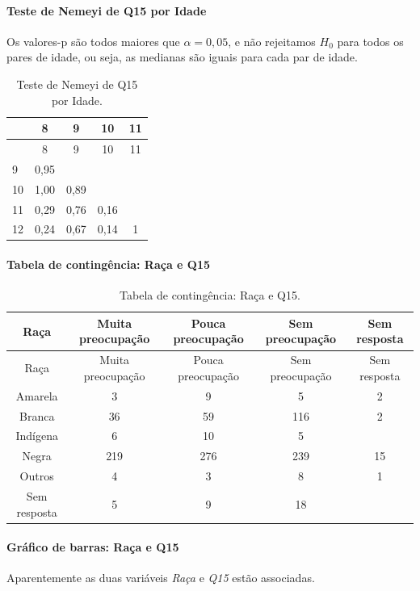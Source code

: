\documentclass[]{article}
\let\oldparagraph\paragraph
\renewcommand{\paragraph}[1]{\oldparagraph{#1}\mbox{}}
\begin{document}
\hypertarget{teste-de-nemeyi-de-q15-por-idade}{%
\paragraph{Teste de Nemeyi de Q15 por Idade}\label{teste-de-nemeyi-de-q15-por-idade}}

Os valores-p são todos maiores que \(\alpha=0,05\), e não rejeitamos \(H_0\) para todos os pares de idade, ou seja, as medianas são iguais para cada par de idade.

\begin{longtable}[]{@{}lcccc@{}}
\caption{\label{tab:unnamed-chunk-118}Teste de Nemeyi de Q15 por Idade.}\tabularnewline
\toprule
& 8 & 9 & 10 & 11\tabularnewline
\midrule
\endfirsthead
\toprule
& 8 & 9 & 10 & 11\tabularnewline
\midrule
\endhead
9 & 0,95 & & &\tabularnewline
10 & 1,00 & 0,89 & &\tabularnewline
11 & 0,29 & 0,76 & 0,16 &\tabularnewline
12 & 0,24 & 0,67 & 0,14 & 1\tabularnewline
\bottomrule
\end{longtable}

\cleardoublepage

\hypertarget{tabela-de-continguxeancia-rauxe7a-e-q15}{%
\paragraph{Tabela de contingência: Raça e Q15}\label{tabela-de-continguxeancia-rauxe7a-e-q15}}

\begin{longtable}[]{@{}ccccc@{}}
\caption{\label{tab:unnamed-chunk-119}Tabela de contingência: Raça e Q15.}\tabularnewline
\toprule
Raça & Muita preocupação & Pouca preocupação & Sem preocupação & Sem resposta\tabularnewline
\midrule
\endfirsthead
\toprule
Raça & Muita preocupação & Pouca preocupação & Sem preocupação & Sem resposta\tabularnewline
\midrule
\endhead
Amarela & 3 & 9 & 5 & 2\tabularnewline
Branca & 36 & 59 & 116 & 2\tabularnewline
Indígena & 6 & 10 & 5 &\tabularnewline
Negra & 219 & 276 & 239 & 15\tabularnewline
Outros & 4 & 3 & 8 & 1\tabularnewline
Sem resposta & 5 & 9 & 18 &\tabularnewline
\bottomrule
\end{longtable}

\hypertarget{gruxe1fico-de-barras-rauxe7a-e-q15}{%
\paragraph{Gráfico de barras: Raça e Q15}\label{gruxe1fico-de-barras-rauxe7a-e-q15}}

Aparentemente as duas variáveis \emph{Raça} e \emph{Q15} estão associadas.
\end{document}
